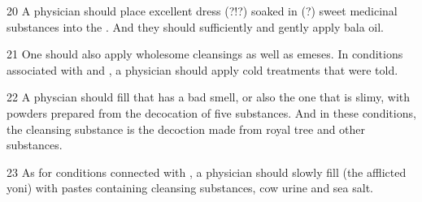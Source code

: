 \begin{translation}
\item [20]
A physician should place excellent dress (?!?) soaked in (?) sweet medicinal substances into the . And they should sufficiently and gently apply bala oil.

\item [21]
One should also apply wholesome cleansings as well as emeses. 
In conditions associated with  and , a physician should apply cold treatments that were told.

\item [22]
A physcian should fill  that has a bad smell, or also the one that is slimy, with powders prepared from the decocation of five substances. And in these conditions, the cleansing substance is the decoction made from royal tree and other substances.

\item [23]
As for conditions connected with , a physician should slowly fill (the afflicted yoni) with pastes containing cleansing substances, cow urine and sea salt.  

\end{translation}
